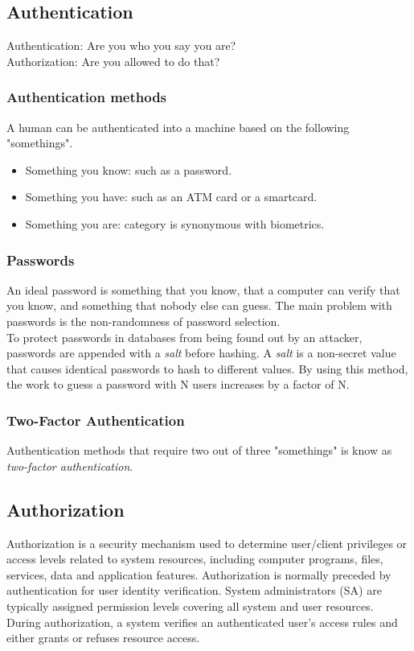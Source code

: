 \documentclass{article}
\begin{document}
\subsection{Authentication}
Authentication: Are you who you say you are?\\
Authorization: Are you allowed to do that?
\subsubsection{Authentication methods}
A human can be authenticated into a machine based on the following "somethings".
\begin{itemize}
    \item Something you know: such as a password.
    \item Something you have: such as an ATM card or a smartcard.
    \item Something you are: category is synonymous with biometrics.
\end{itemize}{}

\subsubsection{Passwords}
An ideal password is something that you know, that a computer can verify that you know, and something that nobody else can guess. The main problem with passwords is the non-randomness of password selection.\\
To protect passwords in databases from being found out by an attacker, passwords are appended with a \textit{salt} before hashing. A \textit{salt} is a non-secret value that causes identical passwords to hash to different values. By using this method, the work to guess a password with N users increases by a factor of N.

\subsubsection{Two-Factor Authentication}
Authentication methods that require two out of three "somethings" is know as \textit{two-factor authentication}.

\subsection{Authorization}
Authorization is a security mechanism used to determine user/client privileges or access levels related to system resources, including computer programs, files, services, data and application features. Authorization is normally preceded by authentication for user identity verification. System administrators (SA) are typically assigned permission levels covering all system and user resources.\\
During authorization, a system verifies an authenticated user's access rules and either grants or refuses resource access.
\end{document}
